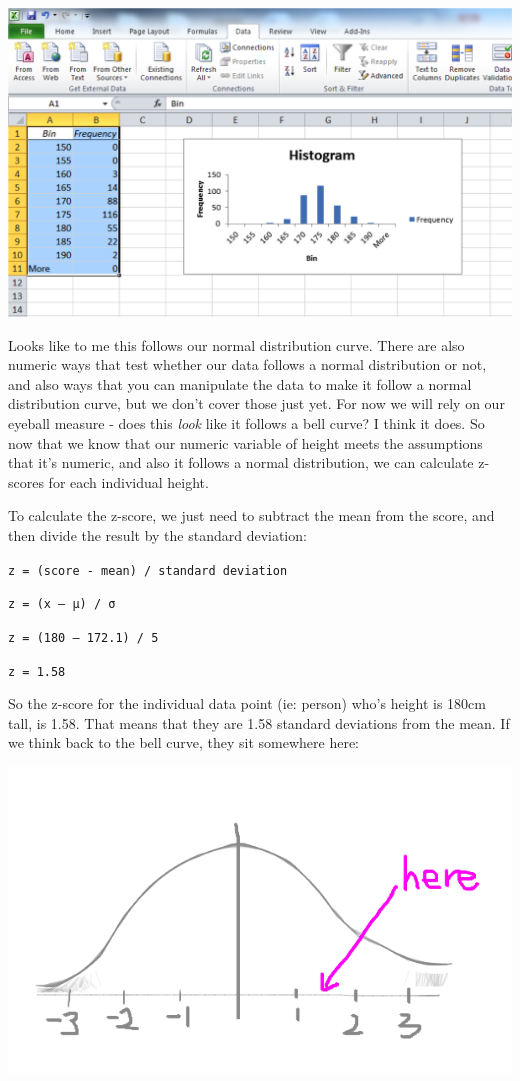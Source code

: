 \documentclass[]{book}
\theoremstyle{definition}
\theoremstyle{definition}
\theoremstyle{definition}
\theoremstyle{remark}
\begin{document}
\includegraphics{imgs/histo.png}

Looks like to me this follows our normal distribution curve. There are
also numeric ways that test whether our data follows a normal
distribution or not, and also ways that you can manipulate the data to
make it follow a normal distribution curve, but we don't cover those
just yet. For now we will rely on our eyeball measure - does this
\emph{look} like it follows a bell curve? I think it does. So now that
we know that our numeric variable of height meets the assumptions that
it's numeric, and also it follows a normal distribution, we can
calculate z-scores for each individual height.

To calculate the z-score, we just need to subtract the mean from the
score, and then divide the result by the standard deviation:

\texttt{z\ =\ (score\ -\ mean)\ /\ standard\ deviation}

\texttt{z\ =\ (x\ –\ μ)\ /\ σ}

\texttt{z\ =\ (180\ –\ 172.1)\ /\ 5}

\texttt{z\ =\ 1.58}

So the z-score for the individual data point (ie: person) who's height
is 180cm tall, is 1.58. That means that they are 1.58 standard
deviations from the mean. If we think back to the bell curve, they sit
somewhere here:

\includegraphics{imgs/your_height_here.png}
\end{document}
